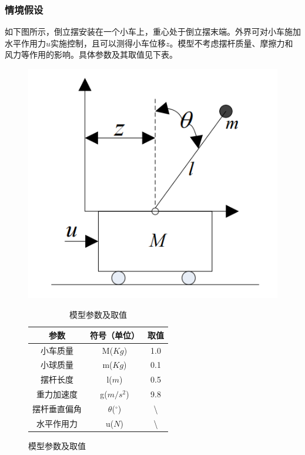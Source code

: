 \documentclass[UTF8]{article}
\begin{document}
\subsubsection{情境假设}
如下图所示，倒立摆安装在一个小车上，重心处于倒立摆末端。外界可对小车施加水平作用力$u$实施控制，且可以测得小车位移$z$。模型不考虑摆杆质量、摩擦力和风力等作用的影响。具体参数及其取值见下表。
\begin{figure}[htbp]
	\centering
	\begin{minipage}{0.49\linewidth}
		\centering
		\includegraphics[width=0.9\linewidth]{figure/倒立摆-小车模型.png}
		\caption{倒立摆小车模型}
	\end{minipage}
	\begin{minipage}{0.49\linewidth}
		\begin{table}[H] %
		\centering %
		\begin{tabular}{ccc} %
			\toprule %
			参数 & 符号（单位） & 取值 \\
			\midrule %
			小车质量 & M($Kg$) & 1.0 \\
			小球质量 & m($Kg$) & 0.1 \\
			摆杆长度 & l($m$) & 0.5 \\
			重力加速度 & g($m/s^2$) & 9.8 \\
			摆杆垂直偏角 & $\theta$($^\circ$) & \textbackslash{} \\
			水平作用力 & u($N$) & \textbackslash{} \\
			\bottomrule %
		\end{tabular}
		\caption{模型参数及取值} %
		\end{table}
	\end{minipage}
\end{figure}
\end{document}

